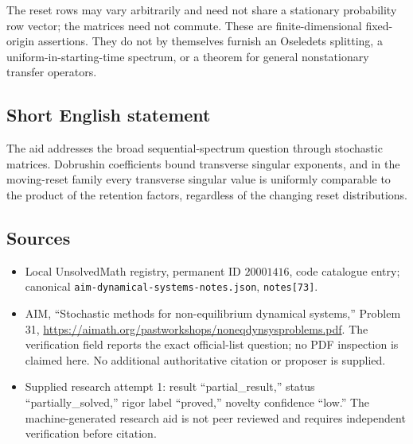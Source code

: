 \documentclass[11pt]{article}
\begin{document}
The reset rows may vary arbitrarily and need not share a stationary probability row vector; the matrices need not commute. These are finite-dimensional fixed-origin assertions. They do not by themselves furnish an Oseledets splitting, a uniform-in-starting-time spectrum, or a theorem for general nonstationary transfer operators.
\subsection{Short English statement}
The aid addresses the broad sequential-spectrum question through stochastic matrices. Dobrushin coefficients bound transverse singular exponents, and in the moving-reset family every transverse singular value is uniformly comparable to the product of the retention factors, regardless of the changing reset distributions.
\subsection{Sources}
\begin{itemize}
\item Local UnsolvedMath registry, permanent ID \(20001416\), code catalogue entry; canonical \texttt{aim-dynamical-systems-notes.json}, \texttt{notes[73]}.
\item AIM, ``Stochastic methods for non-equilibrium dynamical systems,'' Problem 31, \url{https://aimath.org/pastworkshops/noneqdynsysproblems.pdf}. The verification field reports the exact official-list question; no PDF inspection is claimed here. No additional authoritative citation or proposer is supplied.
\item Supplied research attempt 1: result ``partial\_result,'' status ``partially\_solved,'' rigor label ``proved,'' novelty confidence ``low.'' The machine-generated research aid is not peer reviewed and requires independent verification before citation.
\end{itemize}
\end{document}
